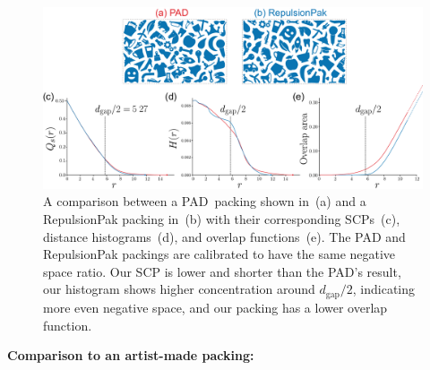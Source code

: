 \begin{figure}[t]
\centering
\includegraphics[width=1.0\textwidth]{figures/metrics/pad_comparison.pdf}
\caption[A comparison between a PAD~packing and a RepulsionPak packing \newline  with their corresponding SCPs]
{\label{pad_comparison}
    A comparison between a PAD~packing shown in~(a) and a RepulsionPak packing in~(b) 
    with their corresponding SCPs~(c), distance histograms~(d), and overlap functions~(e). 
  The PAD and RepulsionPak packings are calibrated
  to have the same negative space ratio.
    Our SCP is lower and shorter than the PAD's result,
    our histogram shows higher concentration around $d_\mathrm{gap} / 2$,
    indicating more even negative space,
    and our packing has a lower overlap function.
}
\end{figure}

\textbf{Comparison to an artist-made packing:} 

